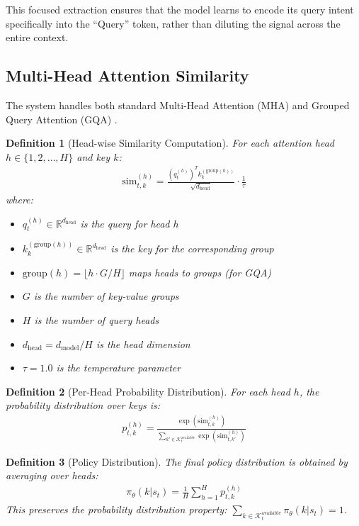 \documentclass[11pt]{article}
\newtheorem{definition}{Definition}
\begin{document}
This focused extraction ensures that the model learns to encode its query intent specifically into the ``Query'' token, rather than diluting the signal across the entire context.

\subsection{Multi-Head Attention Similarity}

The system handles both standard Multi-Head Attention (MHA) and Grouped Query Attention (GQA) \cite{shazeer2019fast}.

\begin{definition}[Head-wise Similarity Computation]
For each attention head $h \in \{1, 2, \ldots, H\}$ and key $k$:
\begin{align}
\text{sim}_{t,k}^{(h)} = \frac{(q_t^{(h)})^T k_k^{(\text{group}(h))}}{\sqrt{d_{\text{head}}}} \cdot \frac{1}{\tau}
\end{align}
where:
\begin{itemize}
    \item $q_t^{(h)} \in \mathbb{R}^{d_{\text{head}}}$ is the query for head $h$
    \item $k_k^{(\text{group}(h))} \in \mathbb{R}^{d_{\text{head}}}$ is the key for the corresponding group
    \item $\text{group}(h) = \lfloor h \cdot G / H \rfloor$ maps heads to groups (for GQA)
    \item $G$ is the number of key-value groups
    \item $H$ is the number of query heads
    \item $d_{\text{head}} = d_{\text{model}} / H$ is the head dimension
    \item $\tau = 1.0$ is the temperature parameter
\end{itemize}
\end{definition}

\begin{definition}[Per-Head Probability Distribution]
For each head $h$, the probability distribution over keys is:
\begin{align}
p_{t,k}^{(h)} = \frac{\exp(\text{sim}_{t,k}^{(h)})}{\sum_{k' \in \mathcal{K}_t^{\text{available}}} \exp(\text{sim}_{t,k'}^{(h)})}
\end{align}
\end{definition}

\begin{definition}[Policy Distribution]
The final policy distribution is obtained by averaging over heads:
\begin{align}
\pi_\theta(k | s_t) = \frac{1}{H} \sum_{h=1}^{H} p_{t,k}^{(h)}
\end{align}
This preserves the probability distribution property: $\sum_{k \in \mathcal{K}_t^{\text{available}}} \pi_\theta(k | s_t) = 1$.
\end{definition}
\end{document}
